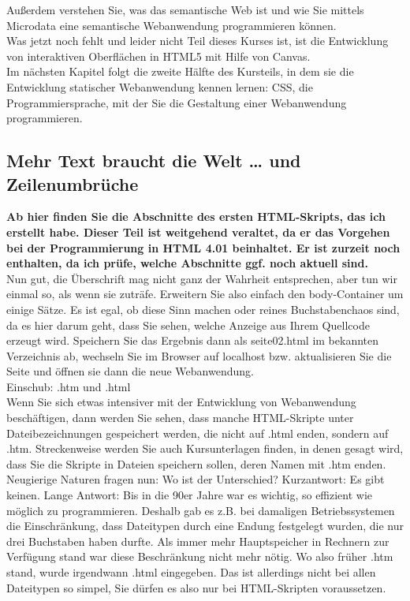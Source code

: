Außerdem verstehen Sie, was das semantische Web ist und wie Sie mittels Microdata eine semantische Webanwendung programmieren können.\\

Was jetzt noch fehlt und leider nicht Teil dieses Kurses ist, ist die Entwicklung von interaktiven Oberflächen in HTML5 mit Hilfe von Canvas.\\

Im nächsten Kapitel folgt die zweite Hälfte des Kursteils, in dem sie die Entwicklung statischer Webanwendung kennen lernen: CSS, die Programmiersprache, mit der Sie die Gestaltung einer Webanwendung programmieren.

\subsection{Mehr Text braucht die Welt … und Zeilenumbrüche}

\textbf{Ab hier finden Sie die Abschnitte des ersten HTML-Skripts, das ich erstellt habe. Dieser Teil ist weitgehend veraltet, da er das Vorgehen bei der Programmierung in HTML 4.01 beinhaltet. Er ist zurzeit noch enthalten, da ich prüfe, welche Abschnitte ggf. noch aktuell sind.}\\

Nun gut, die Überschrift mag nicht ganz der Wahrheit entsprechen, aber tun wir einmal so, als wenn sie zuträfe. Erweitern Sie also einfach den body-Container um einige Sätze. Es ist egal, ob diese Sinn machen oder reines Buchstabenchaos sind, da es hier darum geht, dass Sie sehen, welche Anzeige aus Ihrem Quellcode erzeugt wird. Speichern Sie das Ergebnis dann als seite02.html im bekannten Verzeichnis ab, wechseln Sie im Browser auf localhost bzw. aktualisieren Sie die Seite und öffnen sie dann die neue Webanwendung.\\

Einschub: .htm und .html\\

Wenn Sie sich etwas intensiver mit der Entwicklung von Webanwendung beschäftigen, dann werden Sie sehen, dass manche HTML-Skripte unter Dateibezeichnungen gespeichert werden, die nicht auf .html enden, sondern auf .htm. Streckenweise werden Sie auch Kursunterlagen finden, in denen gesagt wird, dass Sie die Skripte in Dateien speichern sollen, deren Namen mit .htm enden. Neugierige Naturen fragen nun: Wo ist der Unterschied? Kurzantwort: Es gibt keinen. Lange Antwort: Bis in die 90er Jahre war es wichtig, so effizient wie möglich zu programmieren. Deshalb gab es z.B. bei damaligen Betriebssystemen die Einschränkung, dass Dateitypen durch eine Endung festgelegt wurden, die nur drei Buchstaben haben durfte. Als immer mehr Hauptspeicher in Rechnern zur Verfügung stand war diese Beschränkung nicht mehr nötig. Wo also früher .htm stand, wurde irgendwann .html eingegeben. Das ist allerdings nicht bei allen Dateitypen so simpel, Sie dürfen es also nur bei HTML-Skripten voraussetzen.\\

